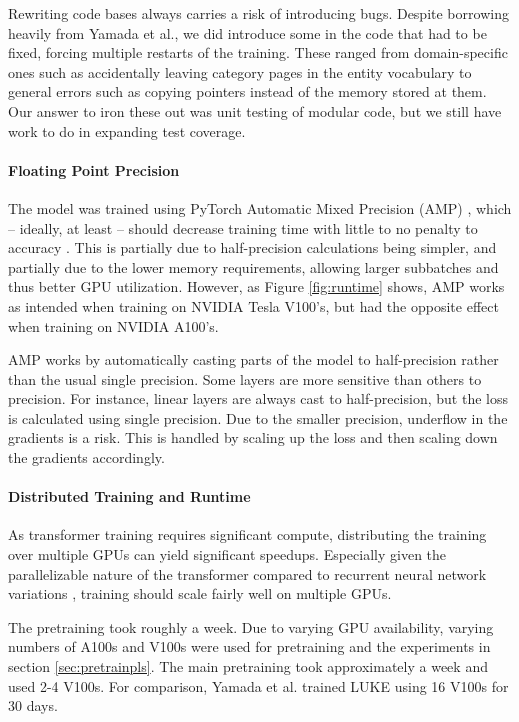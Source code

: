 \documentclass[main.tex]{subfiles}
\begin{document}
Rewriting code bases always carries a risk of introducing bugs.
Despite borrowing heavily from Yamada et al., we did introduce some in the code that had to be fixed, forcing multiple restarts of the training.
These ranged from domain-specific ones such as accidentally leaving category pages in the entity vocabulary to general errors such as copying pointers instead of the memory stored at them.
Our answer to iron these out was unit testing of modular code, but we still have work to do in expanding test coverage.

\paragraph{Floating Point Precision}
The model was trained using PyTorch Automatic Mixed Precision (AMP) \cite{pytorchamp}, which -- ideally, at least -- should decrease training time with little to no penalty to accuracy \cite{huang2020amp}.
This is partially due to half-precision calculations being simpler, and partially due to the lower memory requirements, allowing larger subbatches and thus better GPU utilization.
However, as Figure \ref{fig:runtime} shows, AMP works as intended when training on NVIDIA Tesla V100's, but had the opposite effect when training on NVIDIA A100's.

AMP works by automatically casting parts of the model to half-precision rather than the usual single precision.
Some layers are more sensitive than others to precision.
For instance, linear layers are always cast to half-precision, but the loss is calculated using single precision.
Due to the smaller precision, underflow in the gradients is a risk.
This is handled by scaling up the loss and then scaling down the gradients accordingly.
\cite{pytorchamp}

\paragraph{Distributed Training and Runtime}
As transformer training requires significant compute, distributing the training over multiple GPUs can yield significant speedups.
Especially given the parallelizable nature of the transformer compared to recurrent neural network variations \cite{vaswani2017att}, training should scale fairly well on multiple GPUs.

The pretraining took roughly a week.
Due to varying GPU availability, varying numbers of A100s and V100s were used for pretraining and the experiments in section \ref{sec:pretrainpls}.
The main pretraining took approximately a week and used 2-4 V100s.
For comparison, Yamada et al. trained LUKE using 16 V100s for 30 days. \cite{yamada2020luke}
\end{document}
